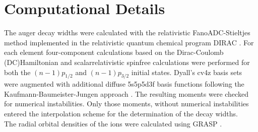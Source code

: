 \section{Computational Details}
\label{section:computational}
The auger decay widths were calculated with the relativistic FanoADC-Stieltjes
method
implemented in the relativistic quantum chemical program DIRAC \cite{DIRAC17}.
For each element four-component calculations based on the
Dirac-Coulomb (DC)Hamiltonian
and scalarrelativistic spinfree calculations were
performed for both the $(n-1)p_{1/2}$ and $(n-1)p_{3/2}$ initial states.
Dyall's cv4z basis sets \cite{Dyall4s-7s09} were augmented with additional diffuse
5s5p5d3f
basis functions following the Kaufmann-Baumeister-Jungen approach
\cite{Kaufmann89}.
The resulting moments were checked for numerical instabilities.
Only those moments, without numerical instabilities entered the interpolation
scheme for the determination of the decay widths.\\
The radial orbital densities of the ions were calculated using GRASP
\cite{Parpia96,xyz}.
